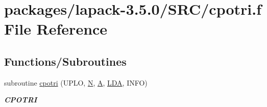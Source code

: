 \hypertarget{cpotri_8f}{}\section{packages/lapack-\/3.5.0/\+S\+R\+C/cpotri.f File Reference}
\label{cpotri_8f}
\subsection*{Functions/\+Subroutines}
\begin{DoxyCompactItemize}
\item 
subroutine \hyperlink{group__complexPOcomputational_ga52b8da4d314abefaee93dd5c1ed7739e}{cpotri} (U\+P\+L\+O, \hyperlink{polmisc_8c_a0240ac851181b84ac374872dc5434ee4}{N}, \hyperlink{classA}{A}, \hyperlink{example__user_8c_ae946da542ce0db94dced19b2ecefd1aa}{L\+D\+A}, I\+N\+F\+O)
\begin{DoxyCompactList}\small\item\em {\bfseries C\+P\+O\+T\+R\+I} \end{DoxyCompactList}\end{DoxyCompactItemize}
